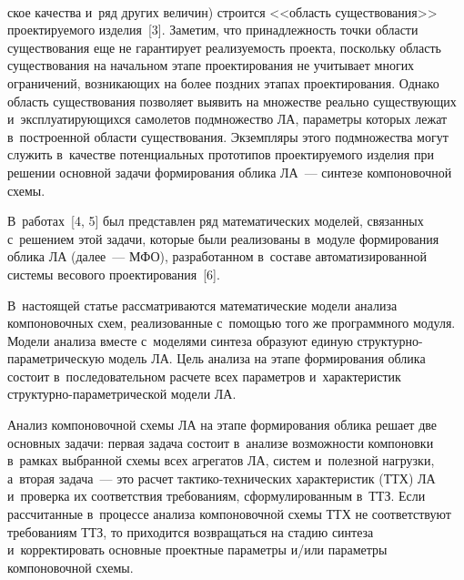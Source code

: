 \begin{figure*}[h] %
  \begin{center}  
    \mbox{%
\epsfxsize=155.078mm 
}
\end{center}
\vspace*{-11pt}
\end{figure*}

\pagebreak


\begin{multicols}{2}


\noindent
 ское качества и~ряд других   величин) строится 
<<об\-ласть существования>> проектируемого изделия~[3]. Заметим, что 
при\-над\-леж\-ность точки об\-ласти существования еще не гарантирует 
ре\-а\-ли\-зу\-емость проекта, поскольку об\-ласть существования на начальном этапе 
проектирования не учитывает многих ограничений, воз\-ни\-ка\-ющих на более 
позд\-них этапах проектирования. Однако область существования позволяет 
выявить на множестве реально существующих и~экс\-плу\-а\-ти\-ру\-ющих\-ся 
самолетов подмножество ЛА, па\-ра\-мет\-ры которых лежат в~по\-стро\-ен\-ной об\-ласти 
существования. Экземпляры этого подмножества могут служить в~качестве 
потенциальных прототипов про\-ек\-ти\-ру\-емо\-го изделия при решении основной 
задачи формирования облика ЛА~--- синтезе компоновочной схемы. 

В~работах~[4, 5] был представлен ряд математических моделей, связанных 
с~решением этой задачи, которые были реализованы в~модуле формирования 
облика ЛА (далее~--- МФО), разработанном в~составе автоматизированной 
системы весового проектирования~[6]. 

В~на\-сто\-ящей статье рас\-смат\-ри\-ва\-ют\-ся 
математические модели анализа компоновочных схем, реализованные  
с~по\-мощью того же программного \mbox{модуля}. Модели анализа вместе 
с~моделями синтеза образуют единую струк\-тур\-но-па\-ра\-мет\-ри\-че\-скую 
модель ЛА. Цель анализа на этапе формирования облика со\-сто\-ит 
в~последовательном расчете всех па\-ра\-мет\-ров и~характеристик  
струк\-тур\-но-па\-ра\-мет\-ри\-че\-ской модели ЛА.

  
  Анализ компоновочной схемы ЛА на этапе формирования облика решает две 
основных задачи: пер\-вая задача состоит в~анализе возможности компоновки 
в~рамках выбранной схемы всех агрегатов ЛА, сис\-тем и~полезной нагрузки, 
а~вторая задача~--- это рас\-чет так\-ти\-ко-тех\-ни\-че\-ских характеристик (ТТХ) ЛА 
и~проверка их соответствия требованиям, сформулированным в~ТТЗ. Если 
\mbox{рассчитанные} в~процессе анализа компоновочной схемы ТТХ не соответствуют 
требованиям ТТЗ, то приходится возвращаться на стадию синтеза 
и~корректировать основные проектные па\-ра\-мет\-ры и/или па\-ра\-мет\-ры 
компоновочной схемы. 
  

\end{multicols}
